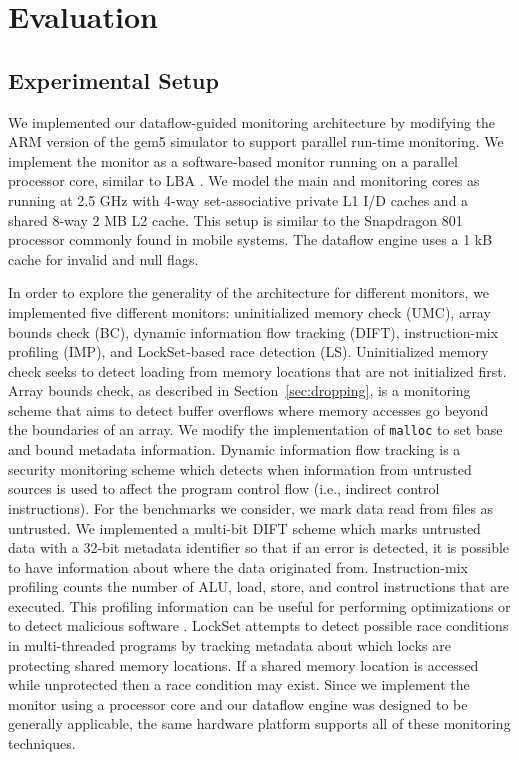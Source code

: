 \section{Evaluation}
\label{sec:evaluation}

\subsection{Experimental Setup}
\label{sec:evaluation.setup}

We implemented our dataflow-guided monitoring architecture by
modifying the ARM version of the gem5 simulator \cite{gem5} to support parallel
run-time monitoring. We implement the monitor as a software-based monitor
running on a parallel processor core, similar to LBA \cite{lba-asid06}.
We model the main and monitoring cores as
running at 2.5
GHz with 4-way set-associative private L1 I/D caches and a shared 8-way 2 MB L2
cache. This setup is similar to the Snapdragon 801 processor commonly found in
mobile systems. The dataflow engine uses a 1 kB cache for invalid and null flags.

In order to explore the generality of the architecture for
different monitors, we implemented five different monitors: uninitialized
memory check (UMC), array bounds check (BC), dynamic information flow
tracking (DIFT), instruction-mix profiling (IMP), and LockSet-based race detection (LS).  Uninitialized memory
check seeks to detect loading from
memory locations that are not initialized first. Array bounds check, as
described in Section~\ref{sec:dropping}, is a monitoring scheme that aims to
detect buffer overflows where memory accesses go beyond the boundaries of an
array. We modify the implementation of {\tt malloc} to set base and bound
metadata information. Dynamic information flow tracking is a security
monitoring scheme
which detects when information from untrusted sources is used to affect the
program control flow (i.e., indirect control instructions). For the benchmarks we consider, we mark data read from
files as untrusted. We implemented a multi-bit DIFT scheme which marks
untrusted data with a 32-bit metadata identifier so
that if an error is detected, it is possible to have information about where
the data originated from. Instruction-mix profiling counts the number of ALU,
load, store, and control instructions that are executed. This profiling
information can be useful for performing optimizations or to detect malicious
software \cite{tang-raid14}.
LockSet \cite{eraser-tocs97} attempts to detect possible race conditions in multi-threaded programs
by tracking metadata about which locks are protecting shared memory
locations. If a shared memory location is accessed while unprotected
then a race condition may exist. Since we implement the monitor using a
processor core and our dataflow engine was designed to be generally applicable,
the same hardware platform supports all of these monitoring techniques.

